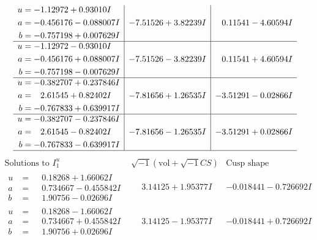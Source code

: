 \documentclass[1p]{elsarticle_modified}
\theoremstyle{definition}
\newcommand{\I}{\sqrt{-1}}
\begin{document}
$$\begin{array}{c|c|c}
\begin{aligned}
u &= -1.12972 + 0.93010 I \\
a &= -0.456176 - 0.088007 I \\
b &= -0.757198 + 0.007629 I\end{aligned}
 & -7.51526 + 3.82239 I & \phantom{-}0.11541 - 4.60594 I \\ \hline\begin{aligned}
u &= -1.12972 - 0.93010 I \\
a &= -0.456176 + 0.088007 I \\
b &= -0.757198 - 0.007629 I\end{aligned}
 & -7.51526 - 3.82239 I & \phantom{-}0.11541 + 4.60594 I \\ \hline\begin{aligned}
u &= -0.382707 + 0.237846 I \\
a &= \phantom{-}2.61545 + 0.82402 I \\
b &= -0.767833 + 0.639917 I\end{aligned}
 & -7.81656 + 1.26535 I & -3.51291 - 0.02866 I \\ \hline\begin{aligned}
u &= -0.382707 - 0.237846 I \\
a &= \phantom{-}2.61545 - 0.82402 I \\
b &= -0.767833 - 0.639917 I\end{aligned}
 & -7.81656 - 1.26535 I & -3.51291 + 0.02866 I\\
 \hline 
 \end{array}$$\newpage$$\begin{array}{c|c|c}  
\text{Solutions to }I^u_{1}& \I (\text{vol} + \sqrt{-1}CS) & \text{Cusp shape}\\
 \hline 
\begin{aligned}
u &= \phantom{-}0.18268 + 1.66062 I \\
a &= \phantom{-}0.734667 - 0.455842 I \\
b &= \phantom{-}1.90756 - 0.02696 I\end{aligned}
 & \phantom{-}3.14125 + 1.95377 I & -0.018441 - 0.726692 I \\ \hline\begin{aligned}
u &= \phantom{-}0.18268 - 1.66062 I \\
a &= \phantom{-}0.734667 + 0.455842 I \\
b &= \phantom{-}1.90756 + 0.02696 I\end{aligned}
 & \phantom{-}3.14125 - 1.95377 I & -0.018441 + 0.726692 I \\ \hline\begin{aligned}

\end{aligned}
\end{array}$$
\end{document}
